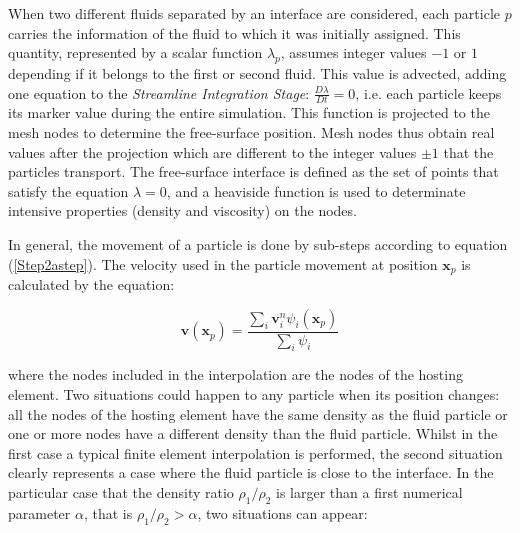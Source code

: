 When two different fluids separated by an interface are considered, each particle $p$ carries the information of the fluid to which it was initially assigned. This quantity, represented by a scalar function $\lambda_p$, assumes integer values $-1$ or $1$ depending if it belongs to the first or second fluid. This value is advected, adding one equation to the \textit{Streamline Integration Stage}: $\frac{D\lambda}{Dt}=0$, i.e. each particle keeps its marker value during the entire simulation. This function is projected to the mesh nodes to determine the free-surface position. Mesh nodes thus obtain real values after the projection which are different to the integer values $\pm1$ that the particles transport. The free-surface interface is defined as the set of points that satisfy the equation $\lambda=0$, and a heaviside function is used to determinate intensive properties (density and viscosity) on the nodes.

In general, the movement of a particle is done by sub-steps according to equation (\ref{Step2astep}). The velocity used in the particle movement at position $\mathbf{x}_p$ is calculated by the equation:

\begin{equation}\label{Interpolation}
    \displaystyle \mathbf{v}(\mathbf{x}_p)=\frac{\displaystyle \sum_{i}\mathbf{v}_i^n\psi_i(\mathbf{x}_p)}{\displaystyle \sum_{i}\psi_i}
\end{equation}

where the nodes included in the interpolation are the nodes of the hosting element. Two situations could happen to any particle when its position changes: all the nodes of the hosting element have the same density as the fluid particle or one or more nodes have a different density than the fluid particle. Whilst in the first case a typical finite element interpolation is performed, the second situation clearly represents a case where the fluid particle is close to the interface. In the particular case that the density ratio $\rho_1/\rho_2$ is larger than a first numerical parameter $\alpha$, that is $\rho_1/\rho_2>\alpha$, two situations can appear:

